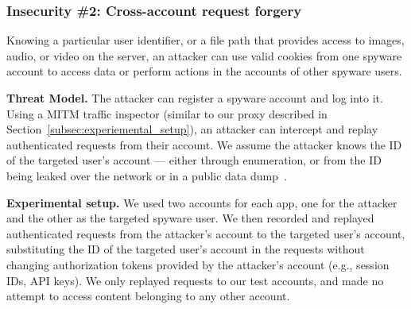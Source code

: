 \documentclass[sigconf,balance=false]{acmart}
\newcommand{\sumanth}[1]{\textcolor{violet}{\noindent[SR: #1]}}
\newcommand{\damon}[1]{\textcolor{blue}{\noindent[DM: #1]}}
\newcommand{\geoff}[1]{\textcolor{purple}{\noindent[GV: #1]}}
\newcommand{\sumanth}[1]{}
\newcommand{\geoff}[1]{}
\newcommand{\damon}[1]{}
\begin{document}
\subsubsection*{Insecurity \#2: Cross-account request forgery}

Knowing a particular user identifier, or a file path that provides access to images, audio, or video on the server, an attacker can use valid
cookies from one spyware account to access data or perform actions in
the accounts of other spyware users.

\textbf{Threat Model.} The attacker can register a spyware account and
log into it. Using a MITM traffic inspector (similar to our proxy
described in Section~\ref{subsec:experiemental_setup}), an attacker
can intercept and replay authenticated requests from their account. We
assume the attacker knows the ID of the targeted user's account ---
either through enumeration, or from the ID being leaked over the
network or in a public data dump~\cite{mSpybrea38:online,
  Companyt8:online, HackerSt66:online, Cerberus12:online,
  Stalkerw59:online}.


\textbf{Experimental setup.} We used two accounts for each app, one
for the attacker and the other as the targeted spyware user.  We then
recorded and replayed authenticated requests from the attacker's
account to the targeted user's account, substituting the ID of the
targeted user's account in the requests without changing authorization
tokens provided by the attacker's account (e.g., session IDs, API
keys).  We only replayed requests to our test accounts, and
made no attempt to access content belonging to any other account.

\end{document}
